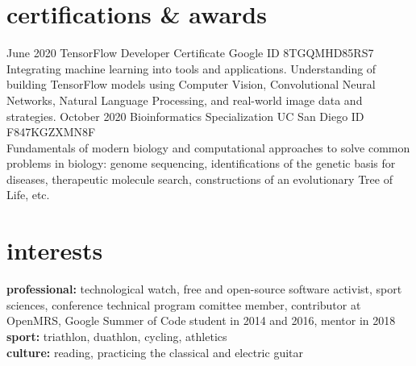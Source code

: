 \documentclass[]{cv-style}          %
\begin{document}
\section{certifications \& awards}

\begin{entrylist}
\entry
{June 2020}
{TensorFlow Developer Certificate}
{Google}
{ID 8TGQMHD85RS7 \\ Integrating machine learning into tools and applications. Understanding of building TensorFlow models using Computer Vision, Convolutional Neural Networks, Natural Language Processing, and real-world image data and strategies.}
\entry
{October 2020}
{Bioinformatics Specialization}
{UC San Diego}
{ID F847KGZXMN8F \\ Fundamentals of modern biology and computational approaches to solve common problems in biology: genome sequencing, identifications of the genetic basis for diseases, therapeutic molecule search, constructions of an evolutionary Tree of Life, etc.}
\end{entrylist}


\section{interests}
  \vspace{-0.2cm}

\textbf{professional:} technological watch, free and open-source software activist, sport sciences, conference technical program comittee member, contributor at OpenMRS, Google Summer of Code student in 2014 and 2016, mentor in 2018\\
\textbf{sport:} triathlon, duathlon, cycling, athletics \\
\textbf{culture:} reading, practicing the classical and electric guitar
\end{document}
